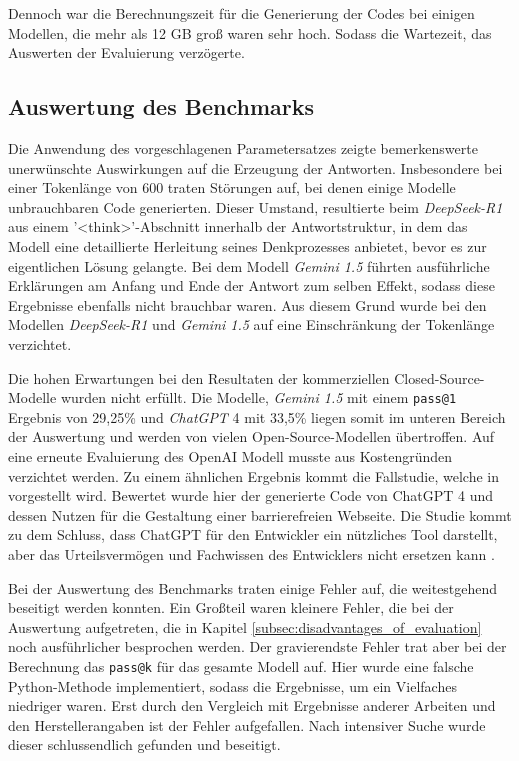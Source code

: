 Dennoch war die Berechnungszeit für die Generierung der Codes bei einigen Modellen, die mehr als 12 GB groß waren sehr hoch. Sodass die Wartezeit, das Auswerten der Evaluierung verzögerte.


\subsection{Auswertung des Benchmarks}
Die Anwendung des vorgeschlagenen Parametersatzes zeigte bemerkenswerte unerwünschte Auswirkungen auf die Erzeugung der Antworten. Insbesondere bei einer Tokenlänge von 600 traten Störungen auf, bei denen einige Modelle unbrauchbaren Code generierten. Dieser Umstand, resultierte beim \textit{DeepSeek-R1} aus einem '<think>'-Abschnitt innerhalb der Antwortstruktur, in dem das Modell eine detaillierte Herleitung seines Denkprozesses anbietet, bevor es zur eigentlichen Lösung gelangte. Bei dem Modell \textit{Gemini 1.5} führten ausführliche Erklärungen am Anfang und Ende der Antwort zum selben Effekt, sodass diese Ergebnisse ebenfalls nicht brauchbar waren. Aus diesem Grund wurde bei den Modellen \textit{DeepSeek-R1} und \textit{Gemini 1.5} auf eine Einschränkung der Tokenlänge verzichtet.\vspace{0.2cm}

Die hohen Erwartungen bei den Resultaten der kommerziellen Closed-Source-Modelle wurden nicht erfüllt. Die Modelle, \textit{Gemini 1.5} mit einem \texttt{pass@1} Ergebnis von 29,25\% und \textit{ChatGPT} 4 mit 33,5\% liegen somit im unteren Bereich der Auswertung und werden von vielen Open-Source-Modellen übertroffen. Auf eine erneute Evaluierung des OpenAI Modell musste aus Kostengründen verzichtet werden.
Zu einem ähnlichen Ergebnis kommt die Fallstudie, welche in \cite{ahmed-2025} vorgestellt wird. Bewertet wurde hier der generierte Code von ChatGPT 4 und dessen Nutzen für die Gestaltung einer barrierefreien Webseite. Die Studie kommt zu dem Schluss, dass ChatGPT für den Entwickler ein nützliches Tool darstellt, aber das Urteilsvermögen und Fachwissen des Entwicklers nicht ersetzen kann \parencite[vgl.][10]{ahmed-2025}.\vspace{0.2cm}

Bei der Auswertung des Benchmarks traten einige Fehler auf, die weitestgehend beseitigt werden konnten. Ein Großteil waren kleinere Fehler, die bei der Auswertung aufgetreten, die in Kapitel \ref{subsec:disadvantages_of_evaluation} noch ausführlicher besprochen werden. Der gravierendste Fehler trat aber bei der Berechnung das \texttt{pass@k} für das gesamte Modell auf. Hier wurde eine falsche Python-Methode implementiert, sodass die Ergebnisse, um ein Vielfaches niedriger waren. Erst durch den Vergleich mit Ergebnisse anderer Arbeiten und den Herstellerangaben ist der Fehler aufgefallen. Nach intensiver Suche wurde dieser schlussendlich gefunden und beseitigt.\vspace{0.2cm}

